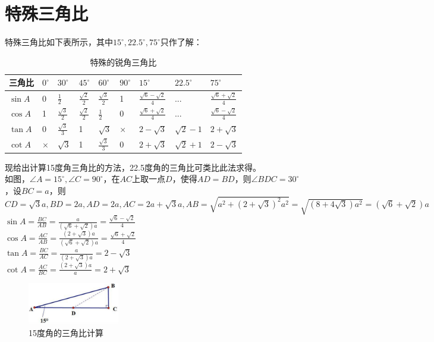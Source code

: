 \documentclass{ecnuthesis}
\begin{document}
\section{特殊三角比}
\begin{knowledge}
    特殊三角比如下表所示，其中$15^\circ,22.5^\circ,75^\circ$只作了解：
\end{knowledge}
\begin{table}[H]
\centering
\caption{特殊的锐角三角比}
\begin{tabular}{l|l|l|l|l|l|l|l|l}
\hline
\hline
三角比 & $0^\circ$ & $30^\circ$ & $45^\circ$ & $60^\circ$ & $90^\circ$ & $15^\circ$ & $22.5^\circ$ & $75^\circ$ \\
\hline
$\sin A$ & 0 & $\frac{1}{2}$ & $\frac{\sqrt 2}{2}$ & $\frac{\sqrt3}{2}$ & 1 & $\frac{\sqrt 6-\sqrt 2}{4}$ & ... & $\frac{\sqrt 6+\sqrt 2}{4}$\\
\hline
$\cos A$ & 1 & $\frac{\sqrt3}{2}$ & $\frac{\sqrt 2}{2}$ & $\frac{1}{2}$ & 0 & $\frac{\sqrt 6+\sqrt 2}{4}$ & ... & $\frac{\sqrt 6-\sqrt 2}{4}$\\
\hline
$\tan A$ & 0 & $\frac{\sqrt3}{3}$ & 1 & $\sqrt3$ & $\times$ & $2-\sqrt 3 $ & $\sqrt2 - 1$ & $2+\sqrt 3$\\
\hline
$\cot A$ & $\times$ & $\sqrt3$ & 1 & $\frac{\sqrt3}{3}$ & 0 & $2+\sqrt 3 $ & $\sqrt2 + 1$ & $2-\sqrt 3$\\
\hline
\hline
\end{tabular}
\end{table}
\begin{knowledge}
    现给出计算15度角三角比的方法，22.5度角的三角比可类比此法求得。\\
    如图，$\angle A=15^\circ,\angle C=90^\circ$，在$AC$上取一点$D$，使得$AD=BD$，则$\angle BDC=30^\circ$，设$BC=a$，则$CD=\sqrt3 a,BD=2a,AD=2a,AC=2a+\sqrt3 a,AB=\sqrt{a^2+(2+\sqrt3)^2a^2}=\sqrt{(8+4\sqrt3)a^2}=(\sqrt6+\sqrt2)a$ \\
    $\sin A=\frac{BC}{AB}=\frac{a}{(\sqrt6+\sqrt2)a}=\frac{\sqrt6-\sqrt2}{4}$ \\
    $\cos A=\frac{AC}{AB}=\frac{(2+\sqrt3)a}{(\sqrt6+\sqrt2)a}=\frac{\sqrt6+\sqrt2}{4}$ \\
    $\tan A=\frac{BC}{AC}=\frac{a}{(2+\sqrt3)a}=2-\sqrt3 $ \\
    $\cot A=\frac{AC}{BC}=\frac{(2+\sqrt3)a}{a}=2+\sqrt3 $ \\
\end{knowledge}
\begin{figure}[H]
\centering
\includegraphics[width=4cm]{picture/906.png}
\caption{15度角的三角比计算}
\end{figure}
\clearpage
\end{document}
